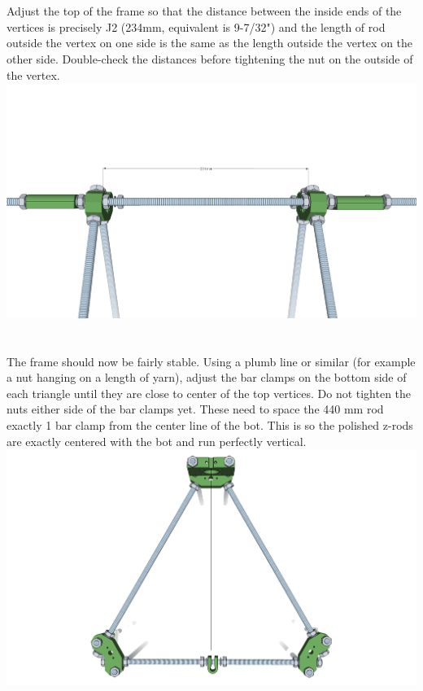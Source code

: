 \documentclass[twoside,openany,a4paper,titlepage]{memoir}
\begin{document}
	\section{}
	Adjust the top of the frame so that the distance between the inside ends of the vertices is precisely J2
	(234mm, equivalent is 9-7/32") and the length of rod outside the vertex on one side is the same as the
	length outside the vertex on the other side. Double-check the distances before tightening the nut on the
	outside of the vertex.\\
	\includegraphics[width=1\linewidth]{graphics/ch5_3.png}
	
	\section{}
	The frame should now be fairly stable. Using a plumb line or similar (for example a nut hanging on a
	length of yarn), adjust the bar clamps on the bottom side of each triangle until they are close to center
	of the top vertices. Do not tighten the nuts either side of the bar clamps yet. These need to space the
	440 mm rod exactly 1 bar clamp from the center line of the bot. This is so the polished z-rods are
	exactly centered with the bot and run perfectly vertical.\\
	\includegraphics[width=1\linewidth]{graphics/ch5_4.png}
	
\end{document}
